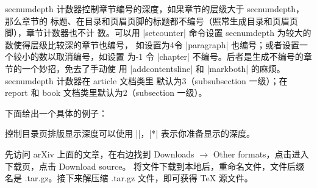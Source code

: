 secnumdepth 计数器控制章节编号的深度，如果章节的层级大于 secnumdepth，那么章节的
标题、在目录和页眉页脚的标题都不编号（照常生成目录和页眉页脚），章节计数器也不计
数。可以用 |setcounter| 命令设置 secnumdepth 为较大的数使得层级比较深的章节也编号，
如设置为4令 |paragraph| 也编号；或者设置一个较小的数以取消编号，如设置
为-1 令 |chapter| 不编号。后者是生成不编号的章节的一个妙招，免去了手动使
用 |addcontentsline| 和 |markboth| 的麻烦。secnumdepth 计数器在 article 文档类里
默认为3（subsubsection 一级）；在 report 和 book 文档类里默认为2（subsection 一级）。

下面给出一个具体的例子：



控制目录页排版显示深度可以使用 |\setcounter{tocdepth}{*}|，|*| 表示你准备显示的深度。


先访问 arXiv 上面的文章，在右边找到 Downloads $\rightarrow$ Other formats，点击进入下载页，点击 Download source。
将文件下载到本地后，重命名文件，文件后缀名是 .tar.gz。接下来解压缩 .tar.gz 文件，即可获得 \TeX{} 源文件。



